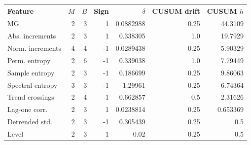 \begin{tabular}{lrrrrrr}
\toprule
Feature & $M$ & $B$ & Sign & $\delta$ & CUSUM drift & CUSUM $h$ \\
\midrule
MG & 2 & 3 & 1 & 0.0882988 & 0.25 & 44.3109 \\
Abs. increments & 2 & 3 & 1 & 0.338305 & 1.0 & 19.7929 \\
Norm. increments & 4 & 4 & -1 & 0.0289438 & 0.25 & 5.90329 \\
Perm. entropy & 2 & 6 & -1 & 0.339038 & 1.0 & 7.79449 \\
Sample entropy & 2 & 3 & -1 & 0.186699 & 0.25 & 9.86063 \\
Spectral entropy & 3 & 3 & -1 & 1.29961 & 0.25 & 6.74364 \\
Trend crossings & 2 & 4 & 1 & 0.662857 & 0.5 & 2.31626 \\
Lag-one corr. & 2 & 3 & 1 & 0.0238814 & 0.25 & 0.653369 \\
Detrended std. & 2 & 3 & -1 & 0.305439 & 0.25 & 0.5 \\
Level & 2 & 3 & 1 & 0.02 & 0.25 & 0.5 \\
\bottomrule
\end{tabular}
